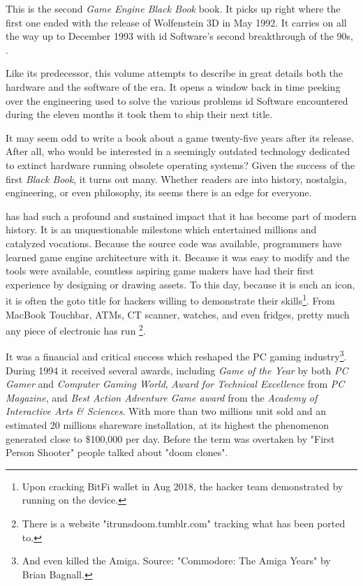 This is the second \textit{Game Engine Black Book} book. It picks up right where the first one ended with the release of Wolfenstein 3D in May 1992. It carries on all the way up to December 1993 with id Software's second breakthrough of the 90s, \doom{}.\\ %
\par
 Like its predecessor, this volume attempts to describe in great details both the hardware and the software of the era. It opens a window back in time peeking over the engineering used to solve the various problems id Software encountered during the eleven months it took them to ship their next title.\\%
\par
It may seem odd to write a book about a game twenty-five years after its release. After all, who would be interested in a seemingly outdated technology dedicated to extinct hardware running obsolete operating systems? Given the success of the first \textit{Black Book}, it turns out many. Whether readers are into history, nostalgia, engineering, or even philosophy, its seems there is an edge for everyone.\\ 

\par
\doom{} has had such a profound and sustained impact that it has become part of modern history. It is an unquestionable milestone which entertained millions and catalyzed vocations. Because the source code was available, programmers have learned game engine architecture with it. Because it was easy to modify and the tools were available, countless aspiring game makers have had their first experience by designing or drawing assets. To this day, because it is such an icon, it is often the goto title for hackers willing to demonstrate their skills\footnote{Upon cracking BitFi wallet in Aug 2018, the hacker team demonstrated by running \doom{} on the device.}. From MacBook Touchbar, ATMs, CT scanner, watches, and even fridges, pretty much any piece of electronic has run \doom{} \footnote{There is a website "itrunsdoom{}.tumblr.com" tracking what \doom{} has been ported to.}.\\
\par

It was a financial and critical success which reshaped the PC gaming industry\footnote{And even killed the Amiga. Source: "Commodore: The Amiga Years" by Brian Bagnall.}. During 1994 it received several awards, including \textit{Game of the Year} by both \textit{PC Gamer} and \textit{Computer Gaming World}, \textit{Award for Technical Excellence} from \textit{PC Magazine}, and \textit{Best Action Adventure Game award} from the \textit{Academy of Interactive Arts \& Sciences}. With more than two millions unit sold and an estimated 20 millions shareware installation, at its highest the phenomenon generated close to \$100,000 per day. Before the term was overtaken by "First Person Shooter" people talked about "doom clones".\\
\par

